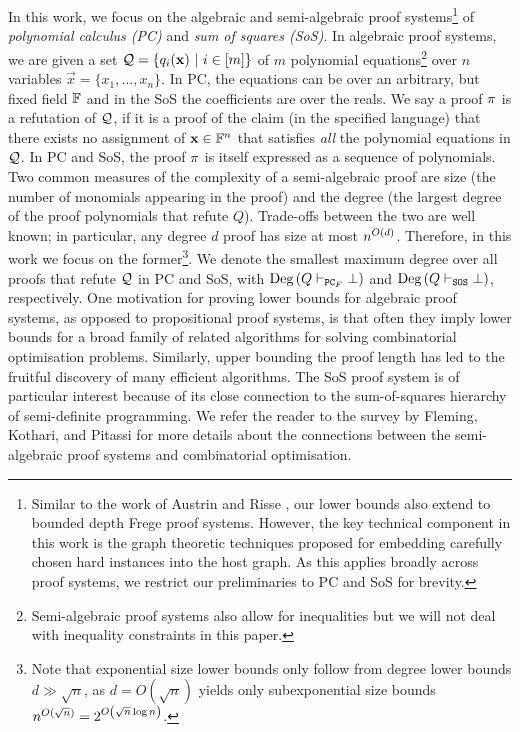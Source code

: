 \documentclass[11pt]{article}
\begin{document}
In this work, we focus on the algebraic and semi-algebraic proof systems\footnote{Similar to the work of Austrin and Risse \citep{Austrin_2022}, our lower bounds also extend to bounded depth Frege proof systems. However, the key technical component in this work is the graph theoretic techniques proposed for embedding carefully chosen hard instances into the host graph.
As this applies broadly across proof systems, we restrict our preliminaries to PC and SoS for brevity.} of \emph{polynomial calculus (PC)} and \emph{sum of squares (SoS)}. %
In algebraic proof systems, we are given a set $\mathcal{Q} =\{q_i(\mathbf{x}) \text{ } |\text{ } i \in [m] \}$ of $m$ polynomial equations\footnote{Semi-algebraic proof systems also allow for inequalities but we will not deal with inequality constraints in this paper.} over $n$ variables $\vec{x} = \{x_1, \dots, x_n\}$.
In PC, the equations can be over an arbitrary, but fixed field $\mathbb{F}$ and in the SoS the coefficients are  over the reals.
We say a proof $\pi$ is a refutation of $\mathcal{Q}$, if it is a proof of the claim (in the specified language) that there exists no assignment of $\mathbf{x} \in \mathbb{F}^n$ that satisfies \emph{all} the polynomial equations in $\mathcal{Q}$.
In PC and SoS, the proof $\pi$ is itself expressed as a sequence of polynomials.
Two common measures of the complexity of a semi-algebraic proof are size (the number of monomials appearing in the proof) and the degree (the largest degree of the proof polynomials that refute $Q$).
Trade-offs between the two are well known; in particular, any degree $d$ proof has size at most $n^{O\left(d\right)}$.
Therefore, in this work we focus on the former\footnote{Note that exponential size lower bounds only follow from degree lower bounds $d \gg \sqrt{n}$, as $d = O(\sqrt{n})$ yields only subexponential size bounds $n^{O(\sqrt{n})} = 2^{O\left(\sqrt{n}\log n\right)}$.
}. We denote the smallest maximum degree over all proofs that refute $\mathcal{Q}$ in PC and SoS, with $\text{Deg}\left(Q \vdash_{\texttt{PC}_F} \bot\right)$ and $\text{Deg}\left(Q \vdash_{\texttt{SOS}} \bot\right)$, respectively.
One motivation for proving lower bounds for algebraic proof systems, as opposed to propositional proof systems, is that often they imply lower bounds for a broad family of related algorithms for solving combinatorial optimisation problems.
Similarly, upper bounding the proof length has led to the fruitful discovery of many efficient algorithms.
The SoS proof system is of particular interest because of its close connection to the sum-of-squares hierarchy of semi-definite programming.
We refer the reader to the survey by Fleming, Kothari, and Pitassi \cite{fleming2019semialgebraic} for more details about the connections between the semi-algebraic proof systems and combinatorial optimisation.\par
\end{document}
